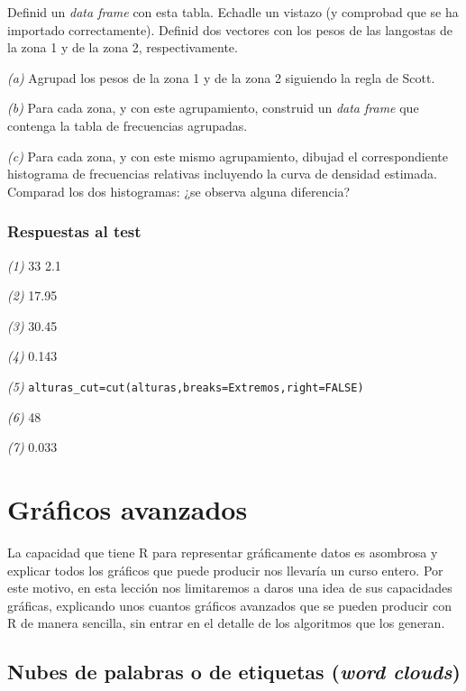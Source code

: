 \documentclass[
]{book}
\theoremstyle{definition}
\theoremstyle{definition}
\theoremstyle{definition}
\theoremstyle{remark}
\begin{document}
Definid un \emph{data frame} con esta tabla. Echadle un vistazo (y comprobad que se ha importado correctamente). Definid dos vectores con los pesos de las langostas de la zona 1 y de la zona 2, respectivamente.

\emph{(a)} Agrupad los pesos de la zona 1 y de la zona 2 siguiendo la regla de Scott.

\emph{(b)} Para cada zona, y con este agrupamiento, construid un \emph{data frame} que contenga la tabla de frecuencias agrupadas.

\emph{(c)} Para cada zona, y con este mismo agrupamiento, dibujad el correspondiente histograma de frecuencias relativas incluyendo la curva de densidad estimada. Comparad los dos histogramas: ¿se observa alguna diferencia?

\hypertarget{respuestas-al-test-10}{%
\subsection*{Respuestas al test}\label{respuestas-al-test-10}}

\emph{(1)} 33 2.1

\emph{(2)} 17.95

\emph{(3)} 30.45

\emph{(4)} 0.143

\emph{(5)} \texttt{alturas\_cut=cut(alturas,breaks=Extremos,right=FALSE)}

\emph{(6)} 48

\emph{(7)} 0.033

\hypertarget{gruxe1ficos-avanzados}{%
\chapter{Gráficos avanzados}\label{gruxe1ficos-avanzados}}

La capacidad que tiene R para representar gráficamente datos es
asombrosa y explicar todos los gráficos que puede producir nos llevaría
un curso entero. Por este motivo, en esta lección nos limitaremos a daros una idea de sus capacidades gráficas, explicando unos cuantos gráficos avanzados que se pueden producir con R de manera sencilla, sin entrar en el detalle de los algoritmos que los generan.

\hypertarget{nubes-de-palabras-o-de-etiquetas-word-clouds}{%
\section{\texorpdfstring{Nubes de palabras o de etiquetas (\emph{word clouds})}{Nubes de palabras o de etiquetas (word clouds)}}\label{nubes-de-palabras-o-de-etiquetas-word-clouds}}
\end{document}
